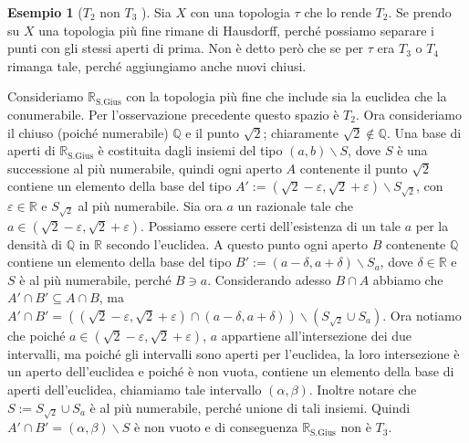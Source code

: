 \documentclass{article}
\newcounter{theo}[section]\setcounter{theo}{0}
\newcounter{excounter}[section]\setcounter{excounter}{0}
\theoremstyle{plain}
\theoremstyle{definition}
\newtheorem{example}[excounter]{Esempio}
\theoremstyle{remark}
\begin{document}
\begin{example}[\(T_{2} \) non \( T_{3}\) ]
    Sia \(X\) con una topologia \(\tau\) che lo rende \(T_{2}\). Se prendo su
    \(X\) una topologia più fine rimane di Hausdorff, perché possiamo separare i
    punti con gli stessi aperti di prima. Non è detto però che se per \(\tau\)
    era \(T_{3}\) o \(T_{4}\) rimanga tale, perché aggiungiamo anche nuovi
    chiusi.

    Consideriamo \(\mathbb{R}_\text{S.Gius}\) con la topologia più fine che
    include sia la euclidea che la conumerabile. Per l'osservazione precedente questo spazio è \(T_{2}\). Ora
    consideriamo il chiuso (poiché numerabile) \(\mathbb{Q}\) e il punto
    \(\sqrt{2}\); chiaramente \(\sqrt{2} \not\in \mathbb{Q}\).
    Una base di aperti di \(\mathbb{R}_\text{S.Gius} \) è costituita dagli
    insiemi del tipo \((a, b) \smallsetminus S\), dove \(S\) è una successione
    al più numerabile, quindi ogni aperto \(A\) contenente il punto \(\sqrt{2}\)
    contiene un elemento della base del tipo
    \(A' := (\sqrt{2} - \varepsilon, \sqrt{2} + \varepsilon) \smallsetminus
    S_{\sqrt{2}}\), con
    \(\varepsilon \in \mathbb{R}\) e \(S_{\sqrt{2}}\) al più numerabile. Sia ora
    \(a\) un razionale tale che \(a \in (\sqrt{2} - \varepsilon, \sqrt{2} +
    \varepsilon)\). Possiamo essere certi dell'esistenza di un tale \(a\)  per la
    densità di \(\mathbb{Q}\) in \(\mathbb{R}\) secondo l'euclidea. A questo
    punto ogni aperto \(B\) contenente \(\mathbb{Q}\) contiene un elemento della base
    del tipo \(B' := (a - \delta, a + \delta) \smallsetminus S_a\), dove \(\delta \in
    \mathbb{R}\) e \(S\) è al più numerabile, perché \(B \ni a\). Considerando
    adesso \(B \cap A\) abbiamo che \(A' \cap  B' \subseteq A \cap B \), ma \(A'
    \cap B' = ((\sqrt{2} - \varepsilon, \sqrt{2} + \varepsilon) \cap (a -
    \delta, a + \delta)) \smallsetminus (S_{\sqrt{2}} \cup S_a )\). Ora notiamo
    che poiché \(a \in (\sqrt{2} - \varepsilon, \sqrt{2} + \varepsilon)\), \(a\)
    appartiene all'intersezione dei due intervalli, ma poiché gli intervalli
    sono aperti per l'euclidea, la loro intersezione è un aperto dell'euclidea e
    poiché è non vuota, contiene un elemento della base di aperti dell'euclidea,
    chiamiamo tale intervallo \((\alpha, \beta)\).
    Inoltre notare che \(S := S_{\sqrt{2}} \cup S_a\) è al più
    numerabile, perché unione di tali insiemi.
    Quindi \(A' \cap B' = (\alpha, \beta) \smallsetminus S\) è non vuoto e di
    conseguenza \(\mathbb{R}_\text{S.Gius} \) non è \(T_{3}\).
\end{example}
\end{document}
